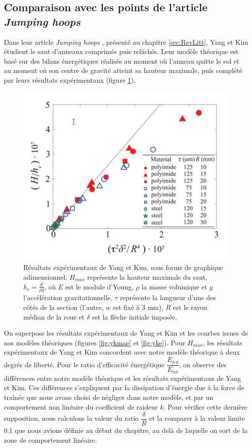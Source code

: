\subsection{Comparaison avec les points de l'article \textit{Jumping hoops}}
Dans leur article \textit{Jumping hoops} \cite{yangkim}, présenté au chapitre \ref{sec:RevLitt}, Yang et Kim étudient le saut d'anneaux comprimés puis relâchés.
Leur modèle théorique est basé sur des bilans énergétiques réalisés au moment où l'anneau quitte le sol et au moment où son centre de gravité atteint sa hauteur maximale, puis complété par leurs résultats expérimentaux (figure \ref{fig:ykres}).

\begin{figure}[htb]
\centering
\includegraphics[width=4.5in]{images_2ddl/ykres.png}
\caption{Résultats expérimentaux de Yang et Kim, sous forme de graphique adimensionnel. $H_{max}$ représente la hauteur maximale du saut, $h_c=\frac{E}{\rho g}$, où $E$ est le module d'Young, $\rho$ la masse volumique et $g$ l'accélération gravitationnelle. $\tau$ représente la longueur d'une des côtés de la section (l'autre, $w$ est fixé à 3 mm), $R$ est le rayon médian de la roue et $\delta$ est la flèche initiale imposée.}
\label{fig:ykres}
\end{figure}


On superpose les résultats expérimentaux de Yang et Kim et les courbes issues de nos modèles théoriques (figures \ref{fig:ykmae} et \ref{fig:yke}).
Pour $H_{max}$, les résultats expérimentaux de Yang et Kim concordent avec notre modèle théorique à deux degrés de liberté.
Pour le ratio d'efficacité énergétique $\dfrac{E_{p.g}}{E_{tot}}$, on observe des différences entre notre modèle théorique et les résultats expérimentaux de Yang et Kim.
Ces différences s'expliquent par la dissipation d'énergie due à la force de traînée que nous avons choisi de négliger dans notre modèle, et par un comportement non linéaire du coefficient de raideur $k$. Pour vérifier cette dernière supposition, nous calculons la valeur du ratio $\dfrac{\delta}{R}$ et la comparer à la valeur limite $0.1$ que nous avions définie au début du chapitre, au delà de laquelle on sort de la zone de comportement linéaire.


